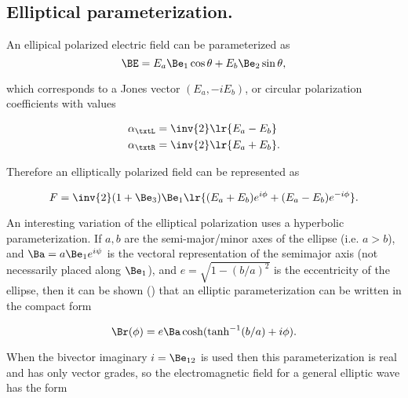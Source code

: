 
\subsection{Elliptical parameterization.}

An ellipical polarized electric field can be parameterized as
\begin{dmath}\label{eqn:ellipticalWaves:340}
\BE
=
E_a \Be_1 \cos\theta + E_b \Be_2 \sin\theta,
\end{dmath}

which corresponds to a Jones vector \( (E_a, -i E_b) \), or circular polarization coefficients with values

\begin{dmath}\label{eqn:polarization:400}
\begin{aligned}
\alpha_\txtL &= \inv{2}\lr{ E_a - E_b } \\
\alpha_\txtR &= \inv{2}\lr{ E_a + E_b }.
\end{aligned}
\end{dmath}

Therefore an elliptically polarized field can be represented as

\begin{dmath}\label{eqn:polarization:420}
F = \inv{2} (1 + \Be_3) \Be_1 \lr{ (E_a + E_b) e^{i\phi} + (E_a - E_b) e^{-i\phi} }.
\end{dmath}

An interesting variation of the elliptical polarization uses a hyperbolic parameterization.
If \( a, b \) are the semi-major/minor axes of the ellipse (i.e. \( a > b \)),
and \( \Ba = a \Be_1 e^{i\psi} \) is the vectoral representation of the semimajor axis (not necessarily placed along \( \Be_1 \)),
and \( e = \sqrt{1 - (b/a)^2} \) is the eccentricity of the ellipse,
then it can be shown (\citep{hestenes1999nfc})
that an elliptic parameterization can be written
in the compact form

\begin{dmath}\label{eqn:ellipticalWaves:360}
\Br(\phi)
=
e \Ba \cosh( \tanh^{-1}(b/a) + i \phi).
\end{dmath}

When the bivector imaginary \( i = \Be_{12} \) is used then
this parameterization is real and has only vector grades, so the electromagnetic field for a general elliptic wave has the form

